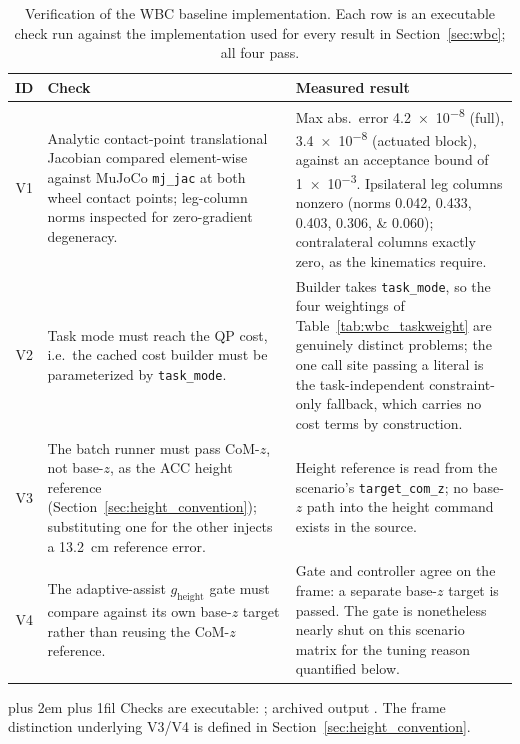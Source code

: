 \documentclass[a4paper,fleqn]{cas-dc}
\newcommand{\tabnote}{\par\leftskip=0pt\rightskip=0pt plus 2em%
  \parfillskip=0pt plus 1fil\relax}
\begin{document}
\begin{table}[pos=!htbp]
\centering
\caption{Verification of the WBC baseline implementation. Each row is an executable check run against the implementation used for every result in Section~\ref{sec:wbc}; all four pass.}
\label{tab:wbc_verification}
\footnotesize
\begin{tabularx}{\columnwidth}{@{}c>{\raggedright\arraybackslash}X>{\raggedright\arraybackslash}X@{}}
\toprule
ID & Check & Measured result \\
\midrule
V1 & Analytic contact-point translational Jacobian compared element-wise against MuJoCo \texttt{mj\_jac} at both wheel contact points; leg-column norms inspected for zero-gradient degeneracy. &
Max abs.\ error \num{4.2e-8} (full), \num{3.4e-8} (actuated block), against an acceptance bound of \num{1e-3}. Ipsilateral leg columns nonzero (norms \numlist{0.042;0.433;0.403;0.306;0.060}); contralateral columns exactly zero, as the kinematics require. \\
V2 & Task mode must reach the QP cost, i.e.\ the cached cost builder must be parameterized by \texttt{task\_mode}. &
Builder takes \texttt{task\_mode}, so the four weightings of Table~\ref{tab:wbc_taskweight} are genuinely distinct problems; the one call site passing a literal is the task-independent constraint-only fallback, which carries no cost terms by construction. \\
V3 & The batch runner must pass CoM-$z$, not base-$z$, as the ACC height reference (Section~\ref{sec:height_convention}); substituting one for the other injects a \SI{13.2}{cm} reference error. &
Height reference is read from the scenario's \texttt{target\_com\_z}; no base-$z$ path into the height command exists in the source. \\
V4 & The adaptive-assist $g_{\text{height}}$ gate must compare against its own base-$z$ target rather than reusing the CoM-$z$ reference. &
Gate and controller agree on the frame: a separate base-$z$ target is passed. The gate is nonetheless nearly shut on this scenario matrix for the tuning reason quantified below. \\
\bottomrule
\end{tabularx}
\vspace{4pt}\tabnote\noindent\footnotesize
Checks are executable: ; archived output .
The frame distinction underlying V3/V4 is defined in Section~\ref{sec:height_convention}.
\end{table}
\end{document}
